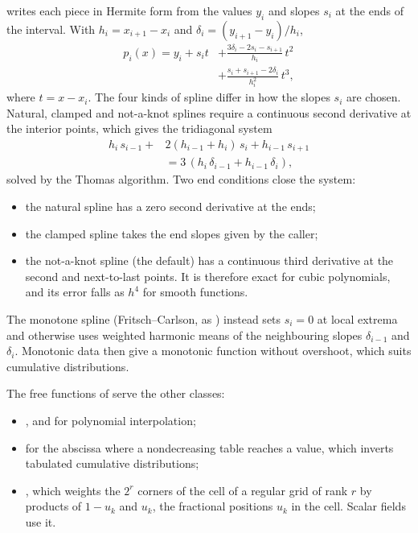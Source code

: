  writes each piece in Hermite form from the values $y_i$ and slopes $s_i$ at the ends of
the interval. With $h_i = x_{i+1}-x_i$ and $\delta_i=(y_{i+1}-y_i)/h_i$,
\begin{equation}
\begin{aligned}
p_i(x) = y_i + s_i t &+ \frac{3\delta_i-2s_i-s_{i+1}}{h_i}\,t^2 \\
&+ \frac{s_i+s_{i+1}-2\delta_i}{h_i^2}\,t^3,
\end{aligned}
\end{equation}
where $t = x-x_i$.
The four kinds of spline differ in how the slopes $s_i$ are chosen. Natural, clamped and not-a-knot splines require a
continuous second derivative at the interior points, which gives the tridiagonal system
\begin{equation}
\begin{aligned}
h_i\,s_{i-1} + &2(h_{i-1}+h_i)\,s_i + h_{i-1}\,s_{i+1} \\
&= 3\,(h_i\,\delta_{i-1}+h_{i-1}\,\delta_i),
\end{aligned}
\end{equation}
solved by the Thomas algorithm. Two end conditions close the system:
\begin{itemize}
\item the natural spline has a zero second derivative at the ends;
\item the clamped spline takes the end slopes given by the caller;
\item the not-a-knot spline (the default) has a continuous third derivative at the second and next-to-last points.
It is therefore exact for cubic polynomials, and its error falls as $h^4$ for smooth functions.
\end{itemize}
The monotone spline (Fritsch--Carlson, as ) instead sets $s_i=0$ at local extrema and otherwise uses
weighted harmonic means of the neighbouring slopes $\delta_{i-1}$ and $\delta_i$. Monotonic data then give a
monotonic function without overshoot, which suits cumulative distributions.

The free functions of  serve the other classes:
\begin{itemize}
\item {},  and  for polynomial
interpolation;
\item {} for the abscissa where a nondecreasing table reaches a value, which inverts tabulated cumulative distributions;
\item {}, which weights the $2^r$ corners of the cell of a regular grid of rank $r$ by products of $1-u_k$ and $u_k$, the fractional positions $u_k$ in the cell. Scalar fields use it.
\end{itemize}


